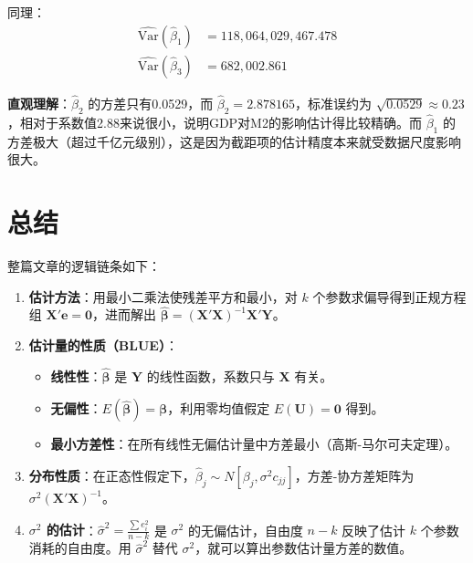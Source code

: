 \documentclass[12pt,a4paper]{ctexart}
\begin{document}
同理：
\begin{align*}
\widehat{\text{Var}}(\hat{\beta}_1) &= 118{,}064{,}029{,}467.478 \\
\widehat{\text{Var}}(\hat{\beta}_3) &= 682{,}002.861
\end{align*}

\textbf{直观理解}：$\hat{\beta}_2$ 的方差只有0.0529，而 $\hat{\beta}_2 = 2.878165$，标准误约为 $\sqrt{0.0529} \approx 0.23$，相对于系数值2.88来说很小，说明GDP对M2的影响估计得比较精确。而 $\hat{\beta}_1$ 的方差极大（超过千亿元级别），这是因为截距项的估计精度本来就受数据尺度影响很大。

\section{总结}

整篇文章的逻辑链条如下：

\begin{enumerate}
    \item \textbf{估计方法}：用最小二乘法使残差平方和最小，对 $k$ 个参数求偏导得到正规方程组 $\mathbf{X}'\mathbf{e} = \mathbf{0}$，进而解出 $\hat{\boldsymbol{\beta}} = (\mathbf{X}'\mathbf{X})^{-1}\mathbf{X}'\mathbf{Y}$。
    \item \textbf{估计量的性质（BLUE）}：
    \begin{itemize}
        \item \textbf{线性性}：$\hat{\boldsymbol{\beta}}$ 是 $\mathbf{Y}$ 的线性函数，系数只与 $\mathbf{X}$ 有关。
        \item \textbf{无偏性}：$E(\hat{\boldsymbol{\beta}}) = \boldsymbol{\beta}$，利用零均值假定 $E(\mathbf{U}) = \mathbf{0}$ 得到。
        \item \textbf{最小方差性}：在所有线性无偏估计量中方差最小（高斯-马尔可夫定理）。
    \end{itemize}
    \item \textbf{分布性质}：在正态性假定下，$\hat{\beta}_j \sim N[\beta_j, \sigma^2 c_{jj}]$，方差-协方差矩阵为 $\sigma^2(\mathbf{X}'\mathbf{X})^{-1}$。
    \item \textbf{$\sigma^2$ 的估计}：$\hat{\sigma}^2 = \frac{\sum e_i^2}{n-k}$ 是 $\sigma^2$ 的无偏估计，自由度 $n-k$ 反映了估计 $k$ 个参数消耗的自由度。用 $\hat{\sigma}^2$ 替代 $\sigma^2$，就可以算出参数估计量方差的数值。
\end{enumerate}
\end{document}
